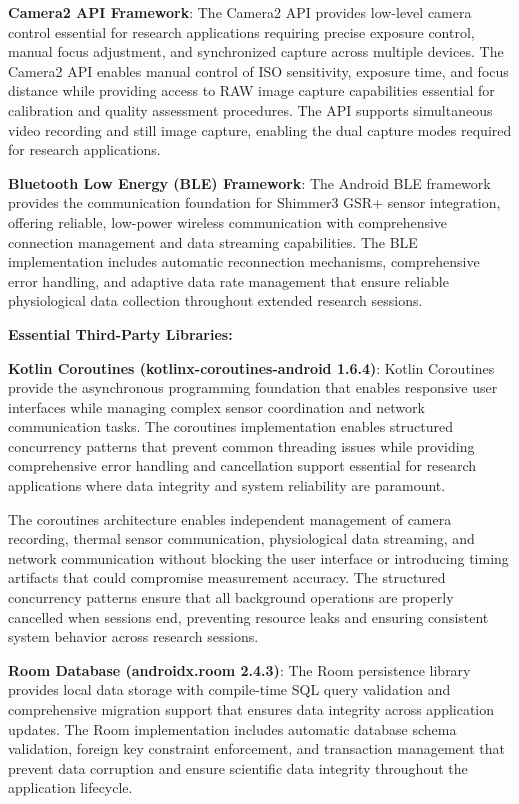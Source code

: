 \documentclass[12pt,a4paper]{report}
\begin{document}
\textbf{Camera2 API Framework}: The Camera2 API provides low-level camera control essential for research applications
requiring precise exposure control, manual focus adjustment, and synchronized capture across multiple devices. The
Camera2 API enables manual control of ISO sensitivity, exposure time, and focus distance while providing access to RAW
image capture capabilities essential for calibration and quality assessment procedures. The API supports simultaneous
video recording and still image capture, enabling the dual capture modes required for research applications.

\textbf{Bluetooth Low Energy (BLE) Framework}: The Android BLE framework provides the communication foundation for Shimmer3
GSR+ sensor integration, offering reliable, low-power wireless communication with comprehensive connection management
and data streaming capabilities. The BLE implementation includes automatic reconnection mechanisms, comprehensive error
handling, and adaptive data rate management that ensure reliable physiological data collection throughout extended
research sessions.

\textbf{Essential Third-Party Libraries:}

\textbf{Kotlin Coroutines (kotlinx-coroutines-android 1.6.4)}: Kotlin Coroutines provide the asynchronous programming
foundation that enables responsive user interfaces while managing complex sensor coordination and network communication
tasks. The coroutines implementation enables structured concurrency patterns that prevent common threading issues while
providing comprehensive error handling and cancellation support essential for research applications where data integrity
and system reliability are paramount.

The coroutines architecture enables independent management of camera recording, thermal sensor communication,
physiological data streaming, and network communication without blocking the user interface or introducing timing
artifacts that could compromise measurement accuracy. The structured concurrency patterns ensure that all background
operations are properly cancelled when sessions end, preventing resource leaks and ensuring consistent system behavior
across research sessions.

\textbf{Room Database (androidx.room 2.4.3)}: The Room persistence library provides local data storage with compile-time SQL
query validation and comprehensive migration support that ensures data integrity across application updates. The Room
implementation includes automatic database schema validation, foreign key constraint enforcement, and transaction
management that prevent data corruption and ensure scientific data integrity throughout the application lifecycle.
\end{document}
